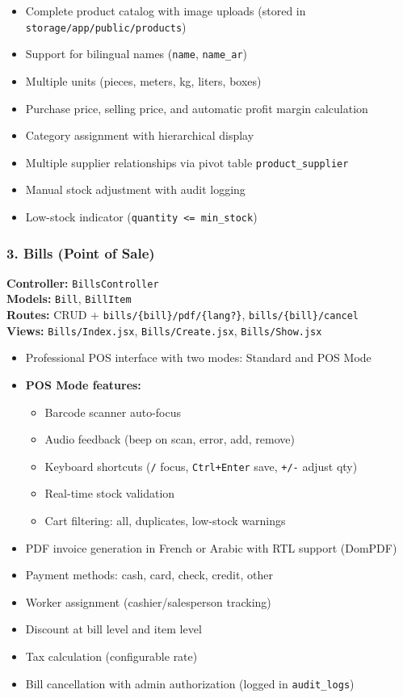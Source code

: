 \begin{itemize}
    \item Complete product catalog with image uploads (stored in \texttt{storage/app/public/products})
    \item Support for bilingual names (\texttt{name}, \texttt{name\_ar})
    \item Multiple units (pieces, meters, kg, liters, boxes)
    \item Purchase price, selling price, and automatic profit margin calculation
    \item Category assignment with hierarchical display
    \item Multiple supplier relationships via pivot table \texttt{product\_supplier}
    \item Manual stock adjustment with audit logging
    \item Low-stock indicator (\texttt{quantity <= min\_stock})
\end{itemize}

\subsubsection{3. Bills (Point of Sale)}

\textbf{Controller:} \texttt{BillsController}\\
\textbf{Models:} \texttt{Bill}, \texttt{BillItem}\\
\textbf{Routes:} CRUD + \texttt{bills/\{bill\}/pdf/\{lang?\}}, \texttt{bills/\{bill\}/cancel}\\
\textbf{Views:} \texttt{Bills/Index.jsx}, \texttt{Bills/Create.jsx}, \texttt{Bills/Show.jsx}

\begin{itemize}
    \item Professional POS interface with two modes: Standard and POS Mode
    \item \textbf{POS Mode features:}
    \begin{itemize}
        \item Barcode scanner auto-focus
        \item Audio feedback (beep on scan, error, add, remove)
        \item Keyboard shortcuts (\texttt{/} focus, \texttt{Ctrl+Enter} save, \texttt{+/-} adjust qty)
        \item Real-time stock validation
        \item Cart filtering: all, duplicates, low-stock warnings
    \end{itemize}
    \item PDF invoice generation in French or Arabic with RTL support (DomPDF)
    \item Payment methods: cash, card, check, credit, other
    \item Worker assignment (cashier/salesperson tracking)
    \item Discount at bill level and item level
    \item Tax calculation (configurable rate)
    \item Bill cancellation with admin authorization (logged in \texttt{audit\_logs})
\end{itemize}

